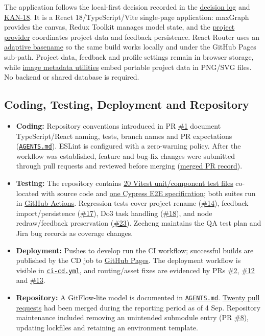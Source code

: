 \documentclass[10pt,a4paper]{article}
\newcommand{\ghbase}{https://github.com/lkevincc0/mm-local-editor}
\newcommand{\PR}[1]{\href{\ghbase/pull/#1}{\##1}}
\newcommand{\jirabase}{https://student-team-zvzgb5e3.atlassian.net}
\newcommand{\JIRA}[1]{\href{\jirabase/browse/KAN-#1}{KAN-#1}}
\newcommand{\ghpath}[2]{\href{\ghbase/#1}{\texttt{#2}}}
\newcommand{\wikibase}{https://student-team-zvzgb5e3.atlassian.net/wiki/spaces/~7120206e0163ea5d37428b992775145124d7e8/pages/}
\newcommand{\wpage}[2]{\href{\wikibase#1}{#2}}
\begin{document}
The application follows the local-first decision recorded in the \wpage{557378}{decision log} and \JIRA{18}. It is a React 18/TypeScript/Vite single-page application: maxGraph provides the canvas, Redux Toolkit manages model state, and the \href{\ghbase/blob/develop/src/components/context/ProjectProvider.tsx}{project provider} coordinates project data and feedback persistence. React Router uses an \href{\ghbase/blob/develop/src/components/utils/basename.ts}{adaptive basename} so the same build works locally and under the GitHub Pages sub-path. Project data, feedback and profile settings remain in browser storage, while \href{\ghbase/blob/develop/src/components/utils/imageMetadata.ts}{image metadata utilities} embed portable project data in PNG/SVG files. No backend or shared database is required.

\subsection{Coding, Testing, Deployment and Repository}
\begin{itemize}
  \item \textbf{Coding:} Repository conventions introduced in PR \PR{1} document TypeScript/React naming, tests, branch names and PR expectations (\ghpath{blob/develop/AGENTS.md}{AGENTS.md}). ESLint is configured with a zero-warning policy. After the workflow was established, feature and bug-fix changes were submitted through pull requests and reviewed before merging (\href{\ghbase/pulls?q=is\%3Apr+is\%3Amerged}{merged PR record}).
  \item \textbf{Testing:} The repository contains \href{\ghbase/tree/develop/src}{20 Vitest unit/component test files} co-located with source code and \href{\ghbase/tree/develop/cypress}{one Cypress E2E specification}; both suites run in \href{\ghbase/blob/develop/.github/workflows/ci-cd.yml}{GitHub Actions}. Regression tests cover project rename (\PR{14}), feedback import/persistence (\PR{17}), Do3 task handling (\PR{18}), and node redraw/feedback preservation (\PR{23}). Zecheng maintains the QA test plan and Jira bug records as coverage changes.
  \item \textbf{Deployment:} Pushes to develop run the CI workflow; successful builds are published by the CD job to \href{https://lkevincc0.github.io/mm-local-editor/}{GitHub Pages}. The deployment workflow is visible in \ghpath{blob/develop/.github/workflows/ci-cd.yml}{ci-cd.yml}, and routing/asset fixes are evidenced by PRs \PR{2}, \PR{12} and \PR{13}.
  \item \textbf{Repository:} A GitFlow-lite model is documented in \ghpath{blob/develop/AGENTS.md}{AGENTS.md}. \href{\ghbase/pulls?q=is\%3Apr+is\%3Amerged}{Twenty pull requests} had been merged during the reporting period as of 4 Sep. Repository maintenance included removing an unintended submodule entry (PR \PR{8}), updating lockfiles and retaining an environment template.
\end{itemize}
\end{document}
